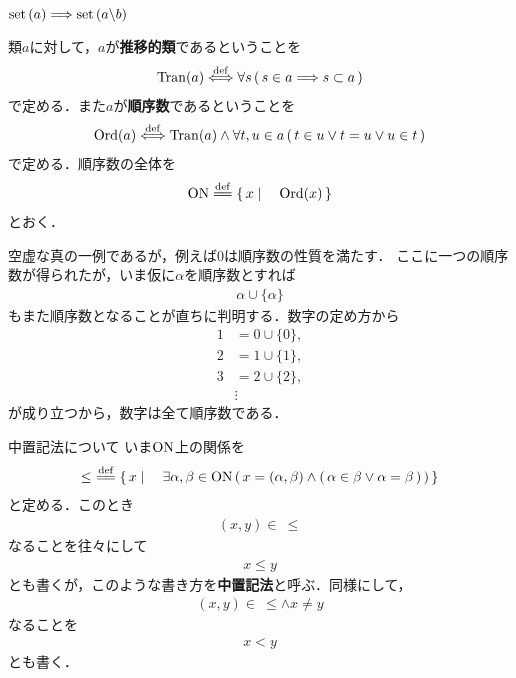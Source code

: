 	$\operatorname*{set} \left(a\right) \Longrightarrow \operatorname*{set} \left(a \backslash b\right)$
	
	\begin{screen}
		\begin{dfn}[順序数]
			類$a$に対して，$a$が{\bf 推移的類}であるということを
			\begin{align}
				\operatorname{Tran}(a) \overset{\mathrm{def}}{\Longleftrightarrow}
				\forall s\, (\, s \in a \Longrightarrow s \subset a\, )
			\end{align}
			で定める．また$a$が{\bf 順序数}であるということを
			\begin{align}
				\operatorname{Ord}(a) \overset{\mathrm{def}}{\Longleftrightarrow}
				\operatorname{Tran}(a)
				\wedge \forall t,u \in a\, (\, t \in u \vee t = u \vee u \in t\, )
			\end{align}
			で定める．順序数の全体を
			\begin{align}
				\ON \defeq \Set{x}{\operatorname{Ord}(x)}
			\end{align}
			とおく．
		\end{dfn}
	\end{screen}
	
	空虚な真の一例であるが，例えば$0$は順序数の性質を満たす．
	ここに一つの順序数が得られたが，いま仮に$\alpha$を順序数とすれば
	\begin{align}
		\alpha \cup \{\alpha\}
	\end{align}
	もまた順序数となることが直ちに判明する．数字の定め方から
	\begin{align}
		1 &= 0 \cup \{0\}, \\
		2 &= 1 \cup \{1\}, \\
		3 &= 2 \cup \{2\}, \\
		&\vdots
	\end{align}
	が成り立つから，数字は全て順序数である．
	
	\begin{itembox}[l]{中置記法について}
		いま$\mathrm{ON}$上の関係を
		\begin{align}
			\leq\ \defeq \Set{x}{\exists \alpha,\beta \in \ON\, 
			(\, x=(\alpha,\beta) \wedge (\, \alpha \in \beta \vee \alpha = \beta\, )\, )}
		\end{align}
		と定める．このとき
		\begin{align}
			(x,y) \in\ \leq
		\end{align}
		なることを往々にして
		\begin{align}
			x \leq y
		\end{align}
		とも書くが，このような書き方を{\bf 中置記法}と呼ぶ．同様にして，
		\begin{align}
			(x,y) \in\ \leq \wedge x \neq y
		\end{align}
		なることを
		\begin{align}
			x < y
		\end{align}
		とも書く．
	\end{itembox}
	
